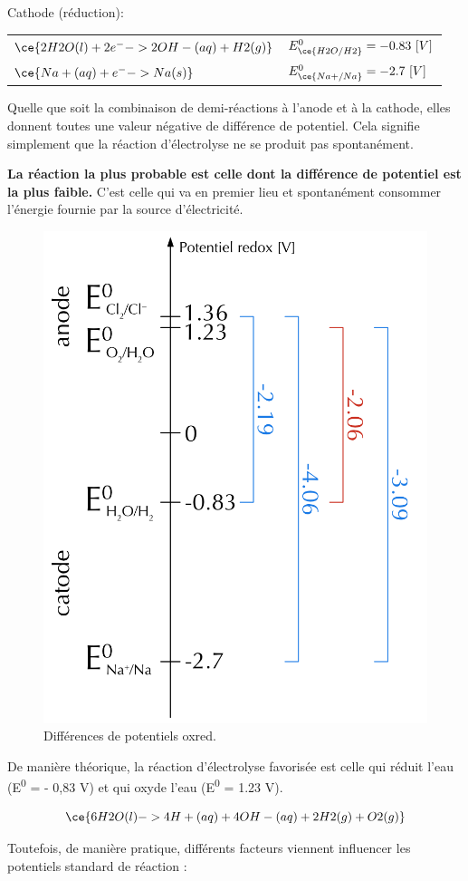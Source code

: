 \documentclass[
  11pt,
  a4paper,
  openany]{book}
\begin{document}
\clearpage

Cathode (réduction):

\begin{longtable}[]{@{}
  >{\centering\arraybackslash}p{}
  >{\raggedright\arraybackslash}p{}@{}}
\toprule\noalign{}
\endhead
\bottomrule\noalign{}
\endlastfoot
\(\ce{2H2O(l) + 2 e^- -> 2OH-(aq) + H2(g)}\) & \(E^0_{\ce{H2O/H2}} = -0.83\ [V]\) \\
\(\ce{Na+(aq) + e^- -> Na(s)}\) & \(E^0_{\ce{Na+/Na}} = -2.7\ [V]\) \\
\end{longtable}

Quelle que soit la combinaison de demi-réactions à l'anode et à la cathode, elles donnent toutes une valeur négative de différence de potentiel. Cela signifie simplement que la réaction d'électrolyse ne se produit pas spontanément.

\textbf{La réaction la plus probable est celle dont la différence de potentiel est la plus faible.} C'est celle qui va en premier lieu et spontanément consommer l'énergie fournie par la source d'électricité.

\begin{figure}

{\centering \includegraphics[width=0.25\linewidth]{images/electrolysis-potentials} 

}

\caption{Différences de potentiels oxred.}\label{fig:electrolysis-potentials}
\end{figure}

De manière théorique, la réaction d'électrolyse favorisée est celle qui réduit l'eau (E\textsuperscript{0} = - 0,83 V) et qui oxyde l'eau (E\textsuperscript{0} = 1.23 V).

\[
\ce{6 H2O(l) -> 4 H+(aq) + 4 OH-(aq) + 2 H2(g) + O2(g)}
\]

Toutefois, de manière pratique, différents facteurs viennent influencer les potentiels standard de réaction :
\end{document}
